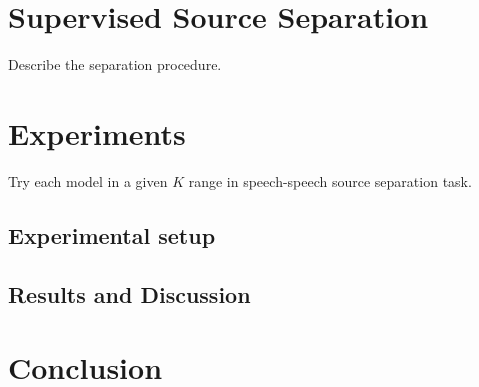 \documentclass{article}
\begin{document}





\section{Supervised Source Separation}
\label{sec:ss}
Describe the separation procedure.

\section{Experiments}
\label{sec:experiments}
Try each model in a given $K$ range in speech-speech source separation task.

\subsection{Experimental setup}
\label{subsec:setup}

\subsection{Results and Discussion}
\label{subsec:results}

\section{Conclusion}
\label{sec:conclusion}




\end{document}
